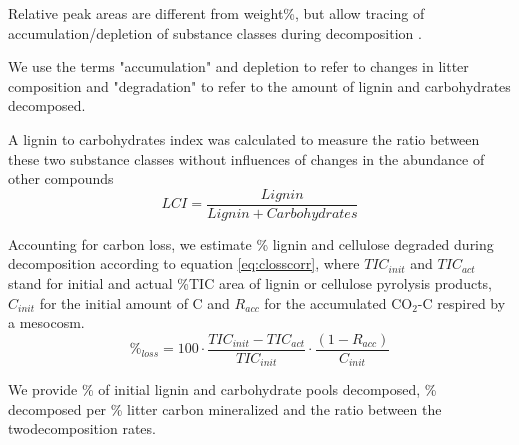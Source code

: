 \documentclass[10pt]{article}
\begin{document}



Relative peak areas are different from weight\%, but allow tracing of accumulation/depletion of substance classes during decomposition \cite{Schellekens2009}.

We use the terms "accumulation" and depletion to refer to changes in litter composition and "degradation" to refer to the amount of lignin and carbohydrates decomposed.

A lignin to carbohydrates index was calculated to measure the ratio between these two substance classes without influences of changes in the abundance of other compounds
\begin{equation}
 LCI=\frac{Lignin}{Lignin + Carbohydrates}
\end{equation}

Accounting for carbon loss, we estimate \% lignin and cellulose degraded during decomposition according to equation \ref{eq:closscorr}, where \emph{$TIC_{init}$} and \emph{$TIC_{act}$} stand for initial and actual \%TIC area of lignin or cellulose pyrolysis products, \emph{$C_{init}$} for the initial amount of C and \emph{$R_{acc}$} for the accumulated CO$_2$-C respired by a mesocosm.
\begin{equation}
 \%_{loss} = 100\cdot\frac{TIC_{init}-TIC_{act}}{TIC_{init}}\cdot\frac{\left ( 1-R_{acc}\right ) }{C_{init}}
 \label{eq:closscorr}
\end{equation}

We provide \% of initial lignin and carbohydrate pools decomposed, \% decomposed per \% litter carbon mineralized and the ratio between the twodecomposition rates.
\end{document}
